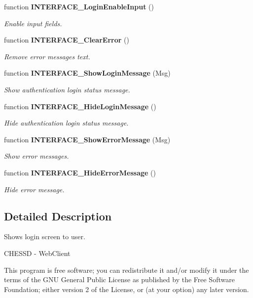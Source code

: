 \begin{CompactItemize}
function {\bf INTERFACE\_\-LoginEnableInput} ()
\begin{CompactList}\small\item\em Enable input fields. \item\end{CompactList}\item 
function {\bf INTERFACE\_\-ClearError} ()
\begin{CompactList}\small\item\em Remove error messages text. \item\end{CompactList}\item 
function {\bf INTERFACE\_\-ShowLoginMessage} (Msg)
\begin{CompactList}\small\item\em Show authentication login status message. \item\end{CompactList}\item 
function {\bf INTERFACE\_\-HideLoginMessage} ()
\begin{CompactList}\small\item\em Hide authentication login status message. \item\end{CompactList}\item 
function {\bf INTERFACE\_\-ShowErrorMessage} (Msg)
\begin{CompactList}\small\item\em Show error messages. \item\end{CompactList}\item 
function {\bf INTERFACE\_\-HideErrorMessage} ()
\begin{CompactList}\small\item\em Hide error message. \item\end{CompactList}\end{CompactItemize}


\subsection{Detailed Description}
Shows login screen to user. 

CHESSD - WebClient

This program is free software; you can redistribute it and/or modify it under the terms of the GNU General Public License as published by the Free Software Foundation; either version 2 of the License, or (at your option) any later version.


